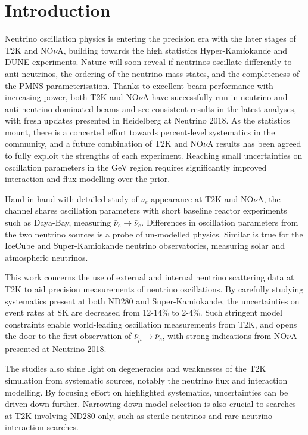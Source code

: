 \chapter{Introduction}
\label{chap:intro}
Neutrino oscillation physics is entering the precision era with the later stages of T2K\cite{t2k_2017} and NO$\nu$A\cite{nova_2018}, building towards the high statistics Hyper-Kamiokande\cite{hyperk} and DUNE\cite{dune} experiments. Nature will soon reveal if neutrinos oscillate differently to anti-neutrinos, the ordering of the neutrino mass states, and the completeness of the PMNS parameterisation\cite{p1,p2,mns}. Thanks to excellent beam performance with increasing power, both T2K and NO$\nu$A have successfully run in neutrino and anti-neutrino dominated beams and see consistent results in the latest analyses, with fresh updates presented in Heidelberg at Neutrino 2018\cite{t2k_neutrino2018, nova_neutrino2018}. As the statistics mount, there is a concerted effort towards percent-level systematics in the community, and a future combination of T2K and NO$\nu$A results has been agreed to fully exploit the strengths of each experiment\cite{t2k_nova, t2k_nova_meet}. Reaching small uncertainties on oscillation parameters in the GeV region requires significantly improved interaction and flux modelling over the prior\cite{t2k_ii, dune_exp}.

Hand-in-hand with detailed study of $\nu_e$ appearance at T2K and NO$\nu$A, the channel shares oscillation parameters with short baseline reactor experiments such as Daya-Bay\cite{daya_bay}, measuring $\bar{\nu}_e\rightarrow \bar{\nu}_e$. Differences in oscillation parameters from the two neutrino sources is a probe of un-modelled physics. Similar is true for the IceCube\cite{icecube} and Super-Kamiokande\cite{superk} neutrino observatories, measuring solar and atmospheric neutrinos.

This work concerns the use of external and internal neutrino scattering data at T2K to aid precision measurements of neutrino oscillations. By carefully studying systematics present at both ND280 and Super-Kamiokande, the uncertainties on event rates at SK are decreased from 12-14\% to 2-4\%. Such stringent model constraints enable world-leading oscillation measurements from T2K\cite{pdg_2017}, and opens the door to the first observation of $\bar{\nu}_\mu \rightarrow \bar{\nu}_e$, with strong indications from NO$\nu$A presented at Neutrino 2018\cite{nova_neutrino2018}.

The studies also shine light on degeneracies and weaknesses of the T2K simulation from systematic sources, notably the neutrino flux and interaction modelling. By focusing effort on highlighted systematics, uncertainties can be driven down further. Narrowing down model selection is also crucial to searches at T2K involving ND280 only, such as sterile neutrinos and rare neutrino interaction searches.

